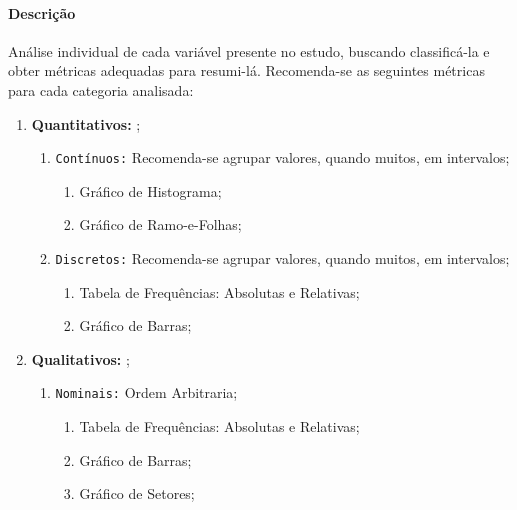 \documentclass{article}
\begin{document}
            \paragraph{Descrição}Análise individual de cada variável presente no estudo, buscando classificá-la e obter métricas adequadas para resumi-lá. Recomenda-se as seguintes métricas para cada categoria analisada:
                \begin{enumerate}[noitemsep]
                    \item \textbf{Quantitativos:} ;
                        \begin{enumerate}[noitemsep]
                            \item \texttt{Contínuos:} Recomenda-se agrupar valores, quando muitos, em intervalos;
                                \begin{enumerate}[noitemsep]
                                    \item Gráfico de Histograma;
                                    \item Gráfico de Ramo-e-Folhas;
                                \end{enumerate}
                            \item \texttt{Discretos:} Recomenda-se agrupar valores, quando muitos, em intervalos;
                                \begin{enumerate}[noitemsep]
                                    \item Tabela de Frequências: Absolutas e Relativas;
                                    \item Gráfico de Barras;
                                \end{enumerate}
                        \end{enumerate}
                    \item \textbf{Qualitativos:} ;
                        \begin{enumerate}[noitemsep]
                            \item \texttt{Nominais:} Ordem Arbitraria; 
                                \begin{enumerate}[noitemsep]
                                    \item Tabela de Frequências: Absolutas e Relativas;
                                    \item Gráfico de Barras;
                                    \item Gráfico de Setores;
                                \end{enumerate}

\end{enumerate}
\end{enumerate}
\end{document}
